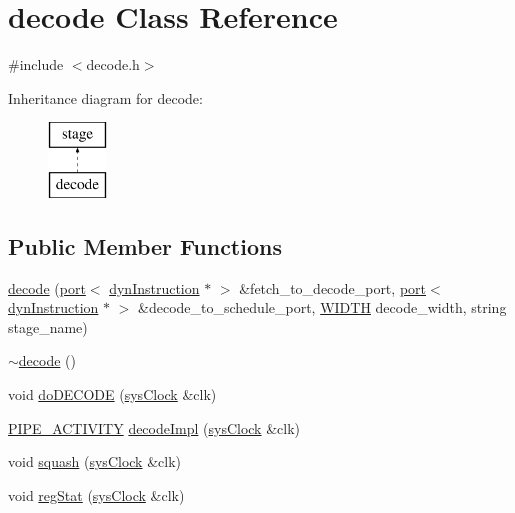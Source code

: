 \hypertarget{classdecode}{
\section{decode Class Reference}
\label{classdecode}
}


{\ttfamily \#include $<$decode.h$>$}

Inheritance diagram for decode:\begin{figure}[H]
\begin{center}
\leavevmode
\includegraphics[height=2.000000cm]{classdecode}
\end{center}
\end{figure}
\subsection*{Public Member Functions}
\begin{DoxyCompactItemize}
\item 
\hyperlink{classdecode_ab0005a9e70d29e5d47a907f33c704e7b}{decode} (\hyperlink{classport}{port}$<$ \hyperlink{classdynInstruction}{dynInstruction} $\ast$ $>$ \&fetch\_\-to\_\-decode\_\-port, \hyperlink{classport}{port}$<$ \hyperlink{classdynInstruction}{dynInstruction} $\ast$ $>$ \&decode\_\-to\_\-schedule\_\-port, \hyperlink{global_2global_8h_a6fa2e24b8a418fa215e183264cbea3aa}{WIDTH} decode\_\-width, string stage\_\-name)
\item 
\hyperlink{classdecode_a4a0499a33c3e1465a0863b976f6b4c5a}{$\sim$decode} ()
\item 
void \hyperlink{classdecode_a387fdd64ecb79472fad23d4190b80516}{doDECODE} (\hyperlink{classsysClock}{sysClock} \&clk)
\item 
\hyperlink{unit_2stage_8h_ab00e4188e8b8974fecb1dfd12764cbb1}{PIPE\_\-ACTIVITY} \hyperlink{classdecode_a4971894a17f1aca1f8a562774949dd1e}{decodeImpl} (\hyperlink{classsysClock}{sysClock} \&clk)
\item 
void \hyperlink{classdecode_afed951843a1cc2c9f9f044caa7c009f1}{squash} (\hyperlink{classsysClock}{sysClock} \&clk)
\item 
void \hyperlink{classdecode_aa9758b61373caf22cabe72ed17006385}{regStat} (\hyperlink{classsysClock}{sysClock} \&clk)
\end{DoxyCompactItemize}


